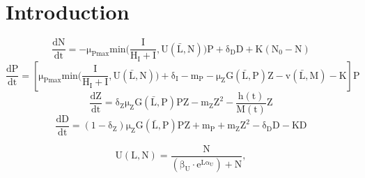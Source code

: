 \section{Introduction}
\begin{equation}
    \label{eq:Ndynamicsrand}
    \mathrm{\frac{dN}{dt} = -\mu_{Pmax}min\bigg(\frac{I}{H_I+I},U(\bar{L},N)\bigg)P+\delta_D D+K(N_0-N)}
\end{equation}
\begin{equation}
    \label{eq:Pdynamicsrand}
    \mathrm{\frac{dP}{dt} = \left[ \mu_{Pmax}min\bigg(\frac{I}{H_I+I},U(\bar{L},N)\bigg)+\delta_I-m_P-\mu_ZG(\bar{L},P)Z-v(\bar{L},M)-K \right] P}
\end{equation}
\begin{equation}
    \label{eq:Zdynamicsrand}
    \mathrm{\frac{dZ}{dt} = \delta_Z\mu_Z G(\bar{L},P)PZ-m_Z Z^2 - \frac{h(t)}{M(t)}Z}
\end{equation}
\begin{equation}
    \label{eq:Ddynamicsrand}
    \mathrm{\frac{dD}{dt} = (1-\delta_Z)\mu_Z G(\bar{L},P)PZ+m_P+m_Z Z^2-\delta_D D-KD}
\end{equation}

\begin{equation}
    \label{eq:nutrientuptakerand}
    \mathrm{U(L,N) = \frac{N}{(\beta_U\cdot e^{L\alpha_U})+N}},
\end{equation}